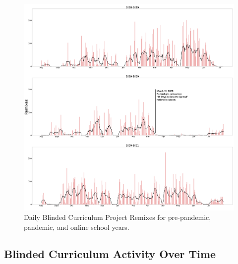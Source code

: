 \documentclass[sigconf,manuscript,review,anonymous]{acmart} %
\def\ts{TIPP\&SEE}
\newcommand{\Scratchencore}[0]{Blinded Curriculum}
\begin{document}
\begin{figure}
     \centering
     \includegraphics[width=\textwidth]{images/graphs/DailyRemixesFinal.png}
     \caption{Daily \Scratchencore{} Project Remixes for pre-pandemic, pandemic, and online school years.}
     \label{fig:daily_remixes}
    
\end{figure}
\subsection{\Scratchencore{} Activity Over Time}
\end{document}
